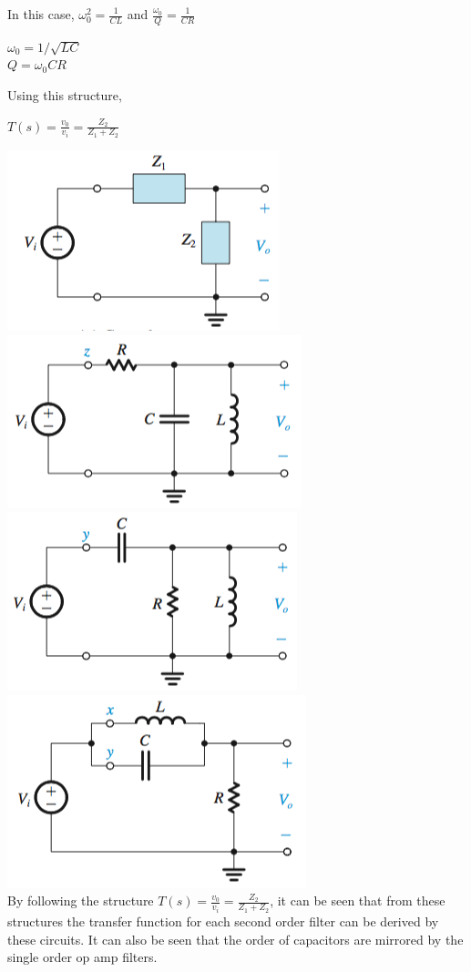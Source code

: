 \documentclass[11pt]{article}
\begin{document}
    In this case, $\omega_{0}^2 = \frac{1}{CL}$ and $\frac{\omega_0}{Q} = \frac{1}{CR}$

    \begin{center}
            $\omega_0 = 1/\sqrt{LC}$ \\
            
            $Q = \omega_0 CR$
    \end{center}

    Using this structure,

    \begin{center}
        $T(s) = \frac{v_0}{v_i} = \frac{Z_2}{Z_1+Z_2}$
    \end{center}

    \includegraphics[width=200 px]{res-general} \includegraphics[width=200 px]{res-lpf} \\
    
    \includegraphics[width=200 px]{res-hpf} \includegraphics[width=200 px]{res-notch}  \\
    
    By following the structure $T(s) = \frac{v_0}{v_i} = \frac{Z_2}{Z_1+Z_2}$, it can be seen that from these structures the transfer function for each second order filter can be derived by these circuits. It can also be seen that the order of capacitors are mirrored by the single order op amp filters.
\end{document}
